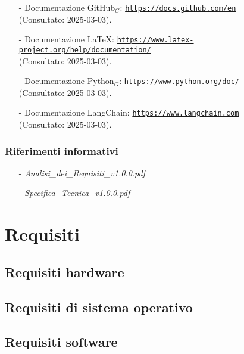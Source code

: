 \documentclass[10pt]{article}
\begin{document}
\begin{justify}
\begin{itemize}
    \item[-] Documentazione GitHub$_G$: \textcolor{blue}{\texttt{\url{https://docs.github.com/en}}} \\
    (Consultato: 2025-03-03).
    
    \item[-] Documentazione \LaTeX: \textcolor{blue}{\texttt{\url{https://www.latex-project.org/help/documentation/}}} \\
    (Consultato: 2025-03-03).
    
    \item[-] Documentazione Python$_G$: \textcolor{blue}{\texttt{\url{https://www.python.org/doc/}}} \\
    (Consultato: 2025-03-03).
    
    \item[-] Documentazione LangChain: \textcolor{blue}{\texttt{\url{https://www.langchain.com}}} \\
    (Consultato: 2025-03-03).
\end{itemize}

\subsubsection{Riferimenti informativi}
\begin{itemize}
    \item[-] \textit{Analisi\_dei\_Requisiti\_v1.0.0.pdf}
    \item[-] \textit{Specifica\_Tecnica\_v1.0.0.pdf}
\end{itemize}



\section{Requisiti}
\label{sec:requisiti}

\subsection{Requisiti hardware}

\subsection{Requisiti di sistema operativo}

\subsection{Requisiti software}


\end{justify}
\end{document}
